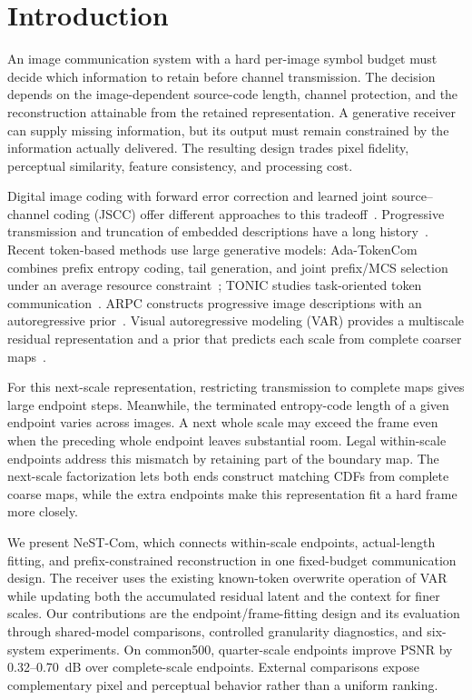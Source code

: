 \section{Introduction}
An image communication system with a hard per-image symbol budget must decide which information to retain before channel transmission. The decision depends on the image-dependent source-code length, channel protection, and the reconstruction attainable from the retained representation. A generative receiver can supply missing information, but its output must remain constrained by the information actually delivered. The resulting design trades pixel fidelity, perceptual similarity, feature consistency, and processing cost.

Digital image coding with forward error correction and learned joint source--channel coding (JSCC) offer different approaches to this tradeoff~\cite{deepjscc,swinjscc}. Progressive transmission and truncation of embedded descriptions have a long history~\cite{chande}. Recent token-based methods use large generative models: Ada-TokenCom combines prefix entropy coding, tail generation, and joint prefix/MCS selection under an average resource constraint~\cite{adatokencom}; TONIC studies task-oriented token communication~\cite{tonic}. ARPC constructs progressive image descriptions with an autoregressive prior~\cite{arpc}. Visual autoregressive modeling (VAR) provides a multiscale residual representation and a prior that predicts each scale from complete coarser maps~\cite{var}.

For this next-scale representation, restricting transmission to complete maps gives large endpoint steps. Meanwhile, the terminated entropy-code length of a given endpoint varies across images. A next whole scale may exceed the frame even when the preceding whole endpoint leaves substantial room. Legal within-scale endpoints address this mismatch by retaining part of the boundary map. The next-scale factorization lets both ends construct matching CDFs from complete coarse maps, while the extra endpoints make this representation fit a hard frame more closely.

We present NeST-Com, which connects within-scale endpoints, actual-length fitting, and prefix-constrained reconstruction in one fixed-budget communication design. The receiver uses the existing known-token overwrite operation of VAR while updating both the accumulated residual latent and the context for finer scales. Our contributions are the endpoint/frame-fitting design and its evaluation through shared-model comparisons, controlled granularity diagnostics, and six-system experiments. On common500, quarter-scale endpoints improve PSNR by 0.32--0.70~dB over complete-scale endpoints. External comparisons expose complementary pixel and perceptual behavior rather than a uniform ranking.
